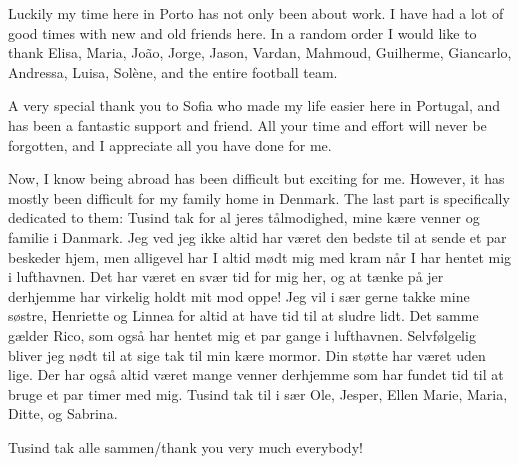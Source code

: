 \documentclass[fleqn]{fcup-thesis}
\begin{document}
\begin{preliminary}
\begin{acknowledgements}
Luckily my time here in Porto has not only been about work. I have had a lot of good times with new
and old friends here. In a random order I would like to thank Elisa, Maria, João, Jorge, Jason,
Vardan, Mahmoud, Guilherme, Giancarlo, Andressa, Luisa, Solène, and the entire football team.

A very special thank you to Sofia who made my life easier here in Portugal, and has been a fantastic
support and friend. All your time and effort will never be forgotten, and I appreciate all you have
done for me.

Now, I know being abroad has been difficult but exciting for me. However, it has mostly been
difficult for my family home in Denmark. The last part is specifically dedicated to them: Tusind tak
for al jeres tålmodighed, mine kære venner og familie i Danmark. Jeg ved jeg ikke altid har været
den bedste til at sende et par beskeder hjem, men alligevel har I altid mødt mig med kram når I har
hentet mig i lufthavnen. Det har været en svær tid for mig her, og at tænke på jer derhjemme har
virkelig holdt mit mod oppe! Jeg vil i sær gerne takke mine søstre, Henriette og Linnea for altid at
have tid til at sludre lidt. Det samme gælder Rico, som også har hentet mig et par gange i
lufthavnen. Selvfølgelig bliver jeg nødt til at sige tak til min kære mormor. Din støtte har været
uden lige. Der har også altid været mange venner derhjemme som har fundet tid til at bruge et par
timer med mig. Tusind tak til i sær Ole, Jesper, Ellen Marie, Maria, Ditte, og Sabrina.

\vspace{7mm}
Tusind tak alle sammen/thank you very much everybody!


\end{acknowledgements}



\begin{abstract}
\lipsum[2]
\end{abstract}

\begin{abstract-pt}
\lipsum[2]
\end{abstract-pt}



\tableofcontents
{}
\listoftables
{}
\listoffigures

\end{preliminary}










\appendix






% 


\nocite{} %
\end{document}
